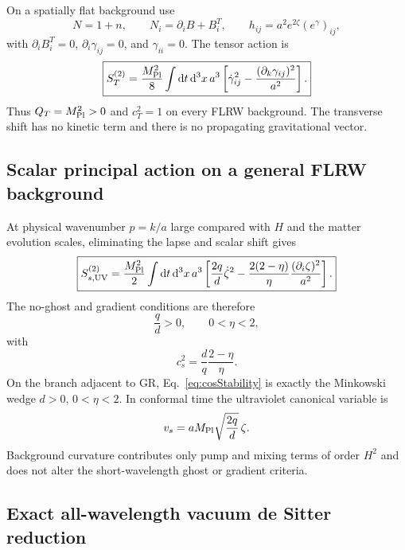 \documentclass[11pt]{article}
\newcommand{\Mpl}{M_{\rm Pl}}
\newcommand{\dd}{\mathrm{d}}
\newcommand{\cs}{c_s}
\begin{document}
On a spatially flat background use
\begin{equation}
N=1+n,\qquad N_i=\partial_iB+B_i^T,
\qquad h_{ij}=a^2e^{2\zeta}(e^\gamma)_{ij},
\end{equation}
with $\partial_iB_i^T=0$, $\partial_i\gamma_{ij}=0$, and $\gamma_{ii}=0$.  The tensor action is
\begin{equation}
\boxed{
S_T^{(2)}=\frac{\Mpl^2}{8}\int\dd t\,\dd^3x\,a^3
\left[\dot\gamma_{ij}^2-\frac{(\partial_k\gamma_{ij})^2}{a^2}\right].}
\label{eq:cosTensor}
\end{equation}
Thus $Q_T=\Mpl^2>0$ and $c_T^2=1$ on every FLRW background.  The transverse shift has no kinetic term and there is no propagating gravitational vector.

\subsection{Scalar principal action on a general FLRW background}

At physical wavenumber $p=k/a$ large compared with $H$ and the matter evolution scales, eliminating the lapse and scalar shift gives
\begin{equation}
\boxed{
S_{s,\rm UV}^{(2)}=\frac{\Mpl^2}{2}\int\dd t\,\dd^3x\,a^3
\left[
\frac{2q}{d}\dot\zeta^2
-\frac{2(2-\eta)}{\eta}\frac{(\partial_i\zeta)^2}{a^2}
\right].}
\label{eq:cosScalarUV}
\end{equation}
The no-ghost and gradient conditions are therefore
\begin{equation}
\boxed{\frac{q}{d}>0,\qquad 0<\eta<2,}
\label{eq:cosStability}
\end{equation}
with
\begin{equation}
\cs^2=\frac{d}{q}\frac{2-\eta}{\eta}.
\end{equation}
On the branch adjacent to GR, Eq.~\eqref{eq:cosStability} is exactly the Minkowski wedge $d>0$, $0<\eta<2$.  In conformal time the ultraviolet canonical variable is
\begin{equation}
v_s=a\Mpl\sqrt{\frac{2q}{d}}\,\zeta.
\end{equation}
Background curvature contributes only pump and mixing terms of order $H^2$ and does not alter the short-wavelength ghost or gradient criteria.

\subsection{Exact all-wavelength vacuum de Sitter reduction}
\end{document}
